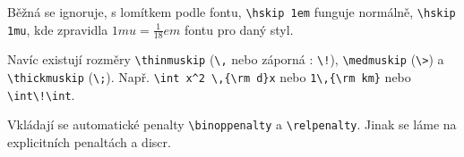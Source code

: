 \documentclass[12pt]{article}					%
\begin{document}
    \begin{definice}[Mezery]
        Běžná se ignoruje, s lomítkem podle fontu, \verb|\hskip 1em| funguje normálně, \verb|\hskip 1mu|, kde zpravidla $1mu = \frac{1}{18}em$ fontu pro daný styl.

        Navíc existují rozměry \verb|\thinmuskip| (\verb|\,| nebo záporná : \verb|\!|), \verb|\medmuskip| (\verb|\>|) a \verb|\thickmuskip| (\verb|\;|). Např. \verb|\int x^2 \,{\rm d}x| nebo \verb|1\,{\rm km}| nebo \verb|\int\!\int|.
    \end{definice}

    \begin{poznamka}
        Vkládají se automatické penalty \verb|\binoppenalty| a \verb|\relpenalty|. Jinak se láme na explicitních penaltách a discr.
    \end{poznamka}
\end{document}
